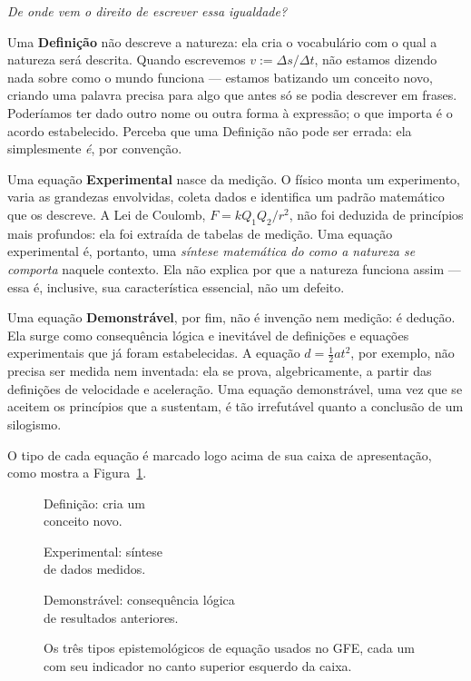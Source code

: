 \begin{center}
  \textit{De onde vem o direito de escrever essa igualdade?}
\end{center}

Uma \textbf{Definição} não descreve a natureza: ela cria o vocabulário com o qual a
natureza será descrita. Quando escrevemos $v := \Delta s / \Delta t$, não estamos
dizendo nada sobre como o mundo funciona --- estamos batizando um conceito novo, criando
uma palavra precisa para algo que antes só se podia descrever em frases. Poderíamos ter
dado outro nome ou outra forma à expressão; o que importa é o acordo estabelecido.
Perceba que uma Definição não pode ser errada: ela simplesmente \emph{é}, por convenção.

Uma equação \textbf{Experimental} nasce da medição. O físico monta um experimento,
varia as grandezas envolvidas, coleta dados e identifica um padrão matemático que os
descreve. A Lei de Coulomb, $F = kQ_1Q_2/r^2$, não foi deduzida de princípios mais
profundos: ela foi extraída de tabelas de medição. Uma equação experimental é,
portanto, uma \emph{síntese matemática do como a natureza se comporta} naquele contexto.
Ela não explica por que a natureza funciona assim --- essa é, inclusive, sua característica
essencial, não um defeito.

Uma equação \textbf{Demonstrável}, por fim, não é invenção nem medição: é dedução.
Ela surge como consequência lógica e inevitável de definições e equações experimentais
que já foram estabelecidas. A equação $d=\frac{1}{2}at^2$, por exemplo, não
precisa ser medida nem inventada: ela se prova, algebricamente, a partir das definições
de velocidade e aceleração. Uma equação demonstrável, uma vez que se aceitem os
princípios que a sustentam, é tão irrefutável quanto a conclusão de um silogismo.

O tipo de cada equação é marcado logo acima de sua caixa de apresentação, como mostra
a Figura~\ref{fig:comousar_tipos}.

\begin{figure}[!h]
\centering
\setcounter{equation}{0}
\renewcommand{\theequation}{\alph{equation}}
\begin{minipage}[t]{0.3\linewidth}
  \centering
  {\small\centering Definição: cria um\\conceito novo.}
\end{minipage}\hfill
\begin{minipage}[t]{0.3\linewidth}
  \centering
  {\small\centering Experimental: síntese\\de dados medidos.}
\end{minipage}\hfill
\begin{minipage}[t]{0.3\linewidth}
  \centering
  {\small\centering Demonstrável: consequência lógica \\ de resultados anteriores.}
\end{minipage}
\caption{Os três tipos epistemológicos de equação usados no GFE, cada um com seu
indicador no canto superior esquerdo da caixa.}
\label{fig:comousar_tipos}
\end{figure}


